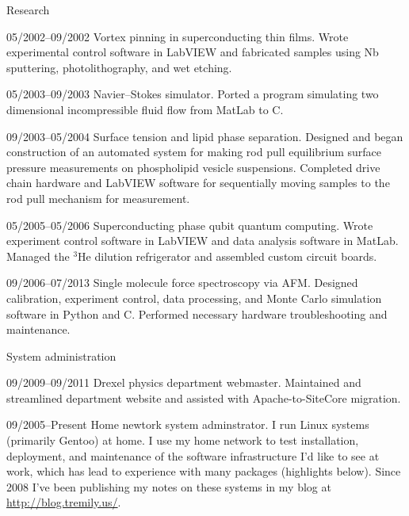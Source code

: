 \begin{vita}
\begin{cv}{}
  \begin{cvlist}{Research}
  \item[05/2002--09/2002] Vortex pinning in superconducting thin films.
    Wrote experimental control software in LabVIEW and fabricated
    samples using Nb sputtering, photolithography, and wet etching.
  \item[05/2003--09/2003] Navier--Stokes simulator.
    Ported a program simulating two dimensional incompressible
    fluid flow from MatLab to C.
  \item[09/2003--05/2004] Surface tension and lipid phase separation.
    Designed and began construction of an automated system for making
    rod pull equilibrium surface pressure measurements on phospholipid
    vesicle suspensions.  Completed drive chain hardware and LabVIEW
    software for sequentially moving samples to the rod pull mechanism
    for measurement.
  \item[05/2005--05/2006] Superconducting phase qubit quantum computing.
    Wrote experiment control software in LabVIEW and data analysis
    software in MatLab.  Managed the $^3$He dilution refrigerator and
    assembled custom circuit boards.
  \item[09/2006--07/2013] Single molecule force spectroscopy via AFM.
    Designed calibration, experiment control, data processing, and
    Monte Carlo simulation software in Python and C.  Performed
    necessary hardware troubleshooting and maintenance.
  \end{cvlist}

  \begin{cvlist}{System administration}
  \item[09/2009--09/2011] Drexel physics department webmaster.
    Maintained and streamlined department website and assisted with
    Apache-to-SiteCore migration.
  \item[09/2005--Present] Home newtork system adminstrator.
    I run Linux systems (primarily Gentoo) at home.  I use my home
    network to test installation, deployment, and maintenance of the
    software infrastructure I'd like to see at work, which has lead to
    experience with many packages (highlights below).  Since 2008 I've
    been publishing my notes on these systems in my blog at
    \url{http://blog.tremily.us/}.
  \end{cvlist}


\end{cv}
\end{vita}
